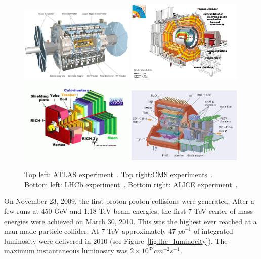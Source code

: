 \begin{figure}[htb]
\centering
\includegraphics[width=0.49\textwidth]{Experiment/atlas.jpg}
\includegraphics[width=0.49\textwidth]{Experiment/cms.jpg}
\includegraphics[width=0.49\textwidth]{Experiment/LHCb.png}
\includegraphics[width=0.49\textwidth]{Experiment/alice.jpg}
\caption{Top left: ATLAS experiment~\cite{ATLAS_image}. Top right:CMS experiments~\cite{CMS_image}. Bottom left: LHCb experiment~\cite{lhcb_image}. Bottom right: ALICE experiment~\cite{ALICE_image}.}
\label{fig:lhc_experiments}
\end{figure}




On November 23, 2009, the first proton-proton collisions were generated.  After a few runs at 450 GeV and 1.18 TeV beam energies, the first 7 TeV center-of-mass energies were achieved on March 30, 2010. This was the highest ever reached at a man-made particle collider.  At 7 TeV approximately 47 $pb^{-1}$ of integrated luminosity were delivered in 2010 (see Figure~\ref{fig:lhc_luminocity}). The maximum instantaneous luminosity was $2 \times 10^{32} cm^{-2}s^{-1}$.

